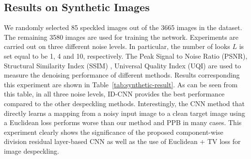 \documentclass[journal]{IEEEtran}
\begin{document}
\subsection{Results on Synthetic Images}
We randomly selected 85 speckled images out of the 3665 images in the dataset.  The remaining 3580 images are used for training the network.  Experiments are carried out on three different noise levels. In particular, the number of looks $L$ is set equal to be 1, 4 and 10, respectively.  The Peak Signal to Noise Ratio (PSNR), Structural Similarity Index (SSIM) \cite{ssim}, Universal Quality Index (UQI) \cite{UQI} are used to measure the denoising performance of different methods.  Results corresponding this experiment are shown in Table~\ref{tab:synthetic-result}.  As can be seen from this table, in all three noise levels, ID-CNN provides the best performance compared to the other despeckling methods. Interestingly, the CNN method \cite{cnn} that directly learns a mapping from a noisy input image to a clean target image using a Euclidean loss performs worse than our method and PPB \cite{ppb} in many cases. This experiment clearly shows the significance of the proposed component-wise division residual layer-based CNN as well as the use of Euclidean + TV loss for image despeckling. 
 
\end{document}
